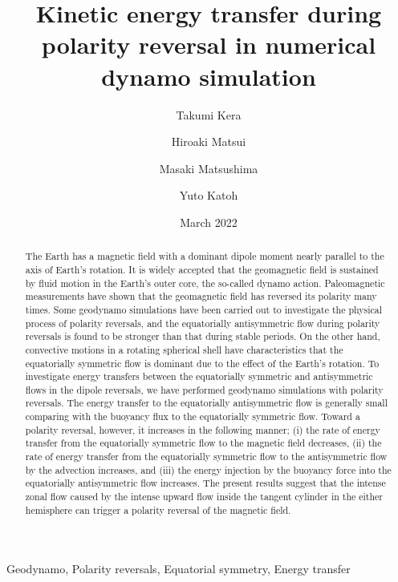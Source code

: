 \documentclass[review]{elsarticle}
\date{March 2022}
\begin{document}
\title{Kinetic energy transfer during polarity reversal in numerical dynamo simulation}

\author[Tohoku]{Takumi Kera}
\author[ucd]{Hiroaki Matsui}
\author[TITECH]{Masaki Matsushima}
\author[Tohoku]{Yuto Katoh}

\address[Tohoku]{Department of Geophysics, Tohoku University, Sendai, Japan.}
\address[ucd]{Department of the Earth and Planetary Sciences, University of California, Davis, CA, USA.}
\address[TITECH]{Department of Earth and Planetary Sciences, Institute of Science Tokyo, Tokyo, Japan.}

\begin{keyword}
Geodynamo, Polarity reversals, Equatorial symmetry, Energy transfer
\end{keyword}

\begin{abstract}
The Earth has a magnetic field with a dominant dipole moment nearly parallel to the axis of Earth’s rotation. 
{\color{teal}
It is widely accepted that the geomagnetic field is sustained by fluid motion in the Earth’s outer core, the so-called dynamo action.
}
Paleomagnetic measurements have shown that the geomagnetic field has reversed its polarity many times. 
Some geodynamo simulations have been carried out to investigate the physical process of polarity reversals, and the equatorially antisymmetric flow during polarity reversals is found to be stronger than that during stable periods. 
On the other hand, convective motions in a rotating spherical shell have characteristics that the equatorially symmetric flow is dominant due to the effect of {\color{red} the Earth's} rotation. 
{\color{teal}
To investigate energy transfers between the equatorially symmetric and antisymmetric flows {\color{red} in the dipole reversals}, we have performed geodynamo simulations with polarity reversals.
}
The energy transfer to the equatorially antisymmetric flow is generally small {\color{red} comparing with the buoyancy flux to the equatorially symmetric flow.}
{\color{teal}
Toward a polarity reversal, however, it increases in the following manner;
}
(i) the rate of energy transfer from the equatorially symmetric flow to the magnetic field decreases, (ii) the rate of energy transfer from the equatorially symmetric flow to the antisymmetric flow by the advection increases, and (iii) the energy injection by the buoyancy force into the equatorially antisymmetric flow increases.
The present results suggest that the intense zonal flow caused by the intense upward flow inside the tangent cylinder in the either hemisphere can trigger a polarity reversal of the magnetic field.
\end{abstract}
\end{document}
